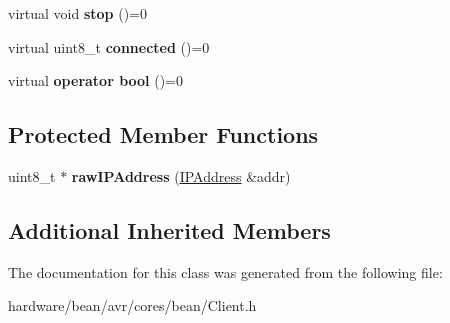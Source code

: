\begin{DoxyCompactItemize}
\item 
\hypertarget{class_client_a02682acc1f4b55e1e8e3e69d09e85fde}{}virtual void {\bfseries stop} ()=0\label{class_client_a02682acc1f4b55e1e8e3e69d09e85fde}

\item 
\hypertarget{class_client_a00710fc15c5e011149350674a99346f2}{}virtual uint8\+\_\+t {\bfseries connected} ()=0\label{class_client_a00710fc15c5e011149350674a99346f2}

\item 
\hypertarget{class_client_a88150a010c776d23f14790ca66877135}{}virtual {\bfseries operator bool} ()=0\label{class_client_a88150a010c776d23f14790ca66877135}

\end{DoxyCompactItemize}
\subsection*{Protected Member Functions}
\begin{DoxyCompactItemize}
\item 
\hypertarget{class_client_a3661f2d64f18e33b483658fb083ffadb}{}uint8\+\_\+t $\ast$ {\bfseries raw\+I\+P\+Address} (\hyperlink{class_i_p_address}{I\+P\+Address} \&addr)\label{class_client_a3661f2d64f18e33b483658fb083ffadb}

\end{DoxyCompactItemize}
\subsection*{Additional Inherited Members}


The documentation for this class was generated from the following file\+:\begin{DoxyCompactItemize}
\item 
hardware/bean/avr/cores/bean/Client.\+h\end{DoxyCompactItemize}
